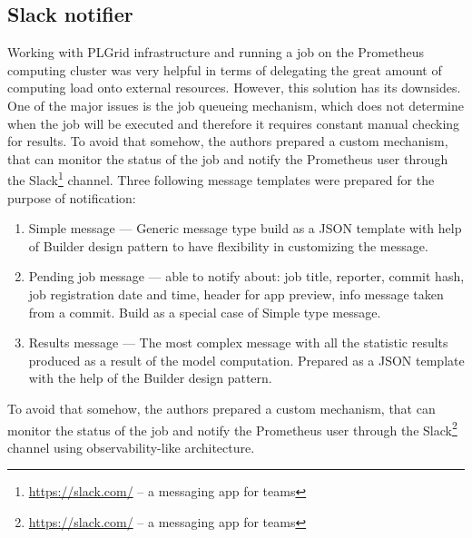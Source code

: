 \subsection{Slack notifier}\label{subsec:slack-notifier}
Working with PLGrid infrastructure and running a job on the Prometheus computing cluster was very helpful in terms of delegating the great amount of computing load onto external resources.
However, this solution has its downsides.
One of the major issues is the job queueing mechanism, which does not determine when the job will be executed and therefore it requires constant manual checking for results.
To avoid that somehow, the authors prepared a custom mechanism, that can monitor the status of the job and notify the Prometheus user through the Slack\footnote{\url{https://slack.com/} – a messaging app for teams} channel.
Three following message templates were prepared for the purpose of notification:
\begin{enumerate}
    \item Simple message --- Generic message type build as a JSON template with help of Builder design pattern to have flexibility in customizing the message.
    \item Pending job message --- able to notify about: job title, reporter, commit hash, job registration date and time, header for app preview, info message taken from a commit.
    Build as a special case of Simple type message.
    \item Results message --- The most complex message with all the statistic results produced as a result of the model computation.
    Prepared as a JSON template with the help of the Builder design pattern.
\end{enumerate}

To avoid that somehow, the authors prepared a custom mechanism, that can monitor the status of the job and notify the Prometheus user through the Slack\footnote{\url{https://slack.com/} – a messaging app for teams} channel using observability-like architecture.
